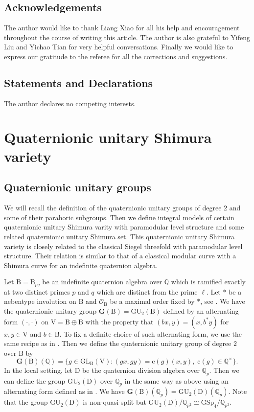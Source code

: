 \documentclass[10pt]{amsart}
\numberwithin{equation}{section}
\theoremstyle{definition}
\def\GL{\mathrm{GL}}
\def\GSp{\mathrm{GSp}}
\def\GU{\mathrm{GU}}
\def\calO{\mathcal{O}}
\def\bfG{\mathbf{G}}
\def\QQ{\mathbb{Q}}
\def\rmc{\mathrm{c}}
\def\rmB{\mathrm{B}}
\def\rmD{\mathrm{D}}
\def\rmV{\mathrm{V}}
\begin{document}
\subsection*{Acknowledgements}  The author would like to thank Liang Xiao for all his help and encouragement throughout the course of writing this article. The author is also grateful to Yifeng Liu and Yichao Tian for very helpful conversations. Finally we would like to express our gratitude to the referee for all the corrections and suggestions.

\subsection*{Statements and Declarations}
The author declares no competing interests.

\section{Quaternionic unitary Shimura variety}

\subsection{Quaternionic unitary groups} We will recall the definition of the quaternionic unitary groups of degree $2$ and some of their parahoric subgroups. Then we define integral models of certain quaternionic unitary Shimura varity with paramodular level structure and some related quaternionic unitary Shimura set. This  quaternionic unitary Shimura variety is closely related to the classical Siegel threefold with paramodular level structure. Their relation is similar to that of a classical modular curve with a Shimura curve for an indefinite quaternion algebra.

Let $\rmB=\rmB_{pq}$ be an indefinite quaternion algebra over $\QQ$ which is ramified exactly at two distinct primes $p$ and $q$ which are distinct from the prime $\ell$. Let $\ast$ be a nebentype involution on $\rmB$ and $\calO_{\rmB}$ be a maximal order fixed by $\ast$, see \cite[A.4, A.5]{KR-Siegel}. We have the quaternionic unitary group $\bfG(\rmB)=\mathrm{GU}_{2}(\rmB)$ defined by an alternating form $(\cdot, \cdot)$ on $\rmV=\rmB\oplus\rmB$ with the property that $(bx, y)=(x, b^{\ast}y)$ for $x, y\in \rmV$ and $b\in \rmB$. To fix a definite choice of such alternating form, we use the same recipe as in \cite[\S 7.1]{Oki}. Then we define the quaternionic unitary group of degree $2$ over $\rmB$ by
\begin{equation*}
\bfG(\rmB)(\QQ)=\{g\in \GL_{\rmB}(\rmV): (gx, gy)=\rmc(g)(x, y),\phantom{.}\rmc(g)\in \QQ^{\times}\}. 
\end{equation*}
In the local setting, let $\rmD$ be the quaternion division algebra over $\QQ_{p}$. Then we can define the group $\GU_{2}(\rmD)$ over $\QQ_{p}$ in the same way as above using an alternating form defined as in \cite[\S 2.1]{Oki}. We have $\bfG(\rmB)(\QQ_{p})=\GU_{2}(\rmD)(\QQ_{p})$. Note that the group $\GU_{2}(\rmD)$ is non-quasi-split but $\GU_{2}(\rmD)/\QQ_{p^{2}}\cong \GSp_{4}/\QQ_{p^{2}}$. 
\end{document}
